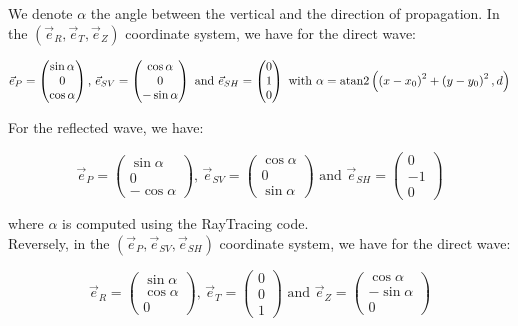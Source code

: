 \documentclass[methods.tex]{subfiles}
\begin{document}
We denote $\alpha$ the angle between the vertical and the direction of propagation. In the $\left( \vec{e}_R, \vec{e}_T, \vec{e}_Z \right)$ coordinate system, we have for the direct wave:

\begin{equation}
\vec{e}_P = \begin{pmatrix}
\sin \alpha \\
0 \\
\cos \alpha
\end{pmatrix} \text{, } \vec{e}_{SV} = \begin{pmatrix}
\cos \alpha \\
0 \\
- \sin \alpha
\end{pmatrix} \text{ and } \vec{e}_{SH} = \begin{pmatrix}
0 \\
1 \\
0
\end{pmatrix} \text{ with } \alpha = \operatorname{atan2} \left( \left( x - x_0 \right) ^2 + \left( y - y_0 \right) ^2, d \right)
\end{equation}

For the reflected wave, we have:

\begin{equation}
\vec{e}_P = \begin{pmatrix}
\sin \alpha \\
0 \\
- \cos \alpha
\end{pmatrix} \text{, } \vec{e}_{SV} = \begin{pmatrix}
\cos \alpha \\
0 \\
\sin \alpha
\end{pmatrix} \text{ and } \vec{e}_{SH} = \begin{pmatrix}
0 \\
- 1 \\
0
\end{pmatrix}
\end{equation}

where $\alpha$ is computed using the RayTracing code. \\

Reversely, in the $\left( \vec{e}_P, \vec{e}_{SV}, \vec{e}_{SH} \right)$ coordinate system, we have for the direct wave:

\begin{equation}
\vec{e}_R = \begin{pmatrix}
\sin \alpha \\
\cos \alpha \\
0
\end{pmatrix} \text{, } \vec{e}_T = \begin{pmatrix}
0 \\
0 \\
1
\end{pmatrix} \text{ and } \vec{e}_Z = \begin{pmatrix}
\cos \alpha \\
- \sin \alpha \\
0
\end{pmatrix}
\end{equation}
\end{document}
